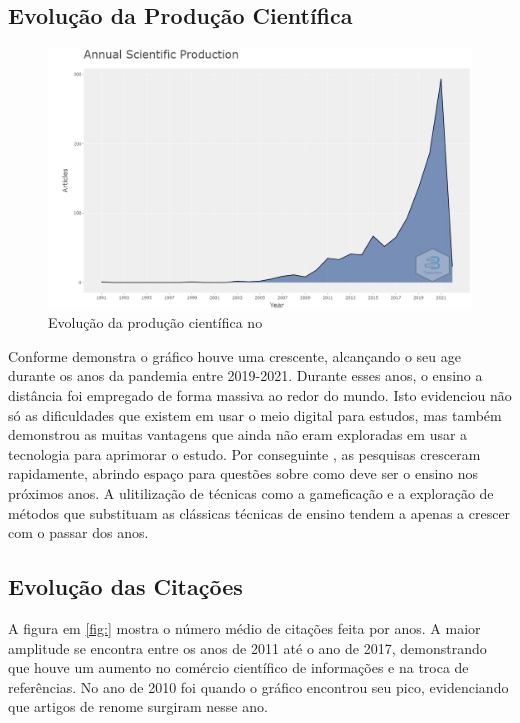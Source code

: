\subsection{Evolução da Produção Científica}



\begin{figure}[ht]
    \centering
    \includegraphics[width=12cm]{experiments/MarcusABR/PesquisaBibliometrica/Imagens/newplot.png}
    \caption{Evolução da produção científica no \dataset\ }
    \label{fig:evolucao}
\end{figure}

Conforme demonstra o gráfico houve uma crescente, alcançando o seu age durante os anos da pandemia entre 2019-2021. Durante esses anos, o ensino a distância foi empregado de forma massiva ao redor do mundo. Isto evidenciou não só as dificuldades que existem em usar o meio digital para estudos, mas também demonstrou  as muitas vantagens que ainda não eram exploradas em usar a tecnologia para aprimorar o estudo.
Por conseguinte , as pesquisas cresceram rapidamente, abrindo espaço para questões sobre como deve ser o ensino nos próximos anos. A ulitilização de técnicas como a gameficação e a exploração de métodos que substituam as clássicas técnicas de ensino tendem a apenas a crescer com o passar dos anos.


\subsection{Evolução das Citações}


A figura em \ref{fig:} mostra o número médio de citações feita por anos. A maior amplitude se encontra entre os anos de 2011 até o ano de 2017, demonstrando que houve um aumento no comércio científico de informações e na troca de referências. No ano de 2010 foi quando o gráfico encontrou seu pico, evidenciando que artigos de renome surgiram nesse ano.

